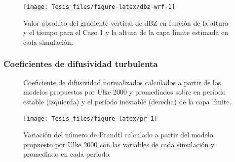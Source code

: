 \documentclass[12pt,spanish,oneside]{book}
\begin{document}
\begin{figure}

{\centering \texttt{[image: Tesis\_files/figure-latex/dbz-wrf-1]} 

}

\caption{Valor absoluto del gradiente vertical de dBZ en función de la altura y el tiempo para el Caso 1 y la altura de la capa límite estimada en cada simulación. \label{pblh-dbz}}\label{fig:dbz-wrf}
\end{figure}

\subsubsection{Coeficientes de difusividad
turbulenta}\label{coeficientes-de-difusividad-turbulenta-1}

\begin{figure}

{\centering {}\newline{}

}

\caption{Coeficiente de difusividad normalizados calculados a partir de los modelos propuestos por Ulke 2000 y promediados sobre en período estable (izquierda) y el período inestable (derecha) de la capa límite. \label{kh-ulke}}\label{fig:k_norm}
\end{figure}

\begin{figure}

{\centering \texttt{[image: Tesis\_files/figure-latex/pr-1]} 

}

\caption{Variación del número de Prandtl calculado a partir del modelo propuesto por Ulke 2000 con las variables de cada simulación y promediado en cada periodo. \label{Pr}}\label{fig:pr}
\end{figure}
\end{document}
